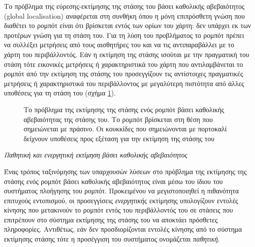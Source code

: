 Το πρόβλημα της εύρεσης-εκτίμησης της στάσης του βάσει καθολικής αβεβαιότητος
(global localisation) αναφέρεται στη συνθήκη όπου η μόνη επιπρόσθετη γνώση που
διαθέτει το ρομπότ είναι ότι βρίσκεται εντός των ορίων του χάρτη: δεν υπάρχει
εκ των προτέρων γνώση για τη στάση του. Για τη λύση του προβλήματος το ρομπότ
πρέπει να συλλέξει μετρήσεις από τους αισθητήρες του και να τις αντιπαραβάλλει
με το χάρτη του περιβάλλοντός. Εάν η εκτίμηση της στάσης ισούται με την
πραγματική του στάση τότε εικονικές μετρήσεις ή χαρακτηριστικά του χάρτη που
αντιλαμβάνεται το ρομπότ από την εκτίμηση της στάσης του προσεγγίζουν τις
αντίστοιχες πραγματικές μετρήσεις ή χαρακτηριστικά του περιβάλλοντος με
μεγαλύτερη πιστότητα από άλλες υποθέσεις για τη στάση του (σχήμα
\ref{fig:global_localisation}).

\begin{figure}[htbp]\centering
  
  \caption{\small Το πρόβλημα της εκτίμησης της στάσης ενός ρομπότ βάσει καθολικής
           αβεβαιότητας της στάσης του. Το ρομπότ βρίσκεται στη θέση που
           σημειώνεται με πράσινο. Οι κουκκίδες που σημειώνονται με πορτοκαλί
           δείχνουν υποθέσεις προς εξέταση για την εκτίμηση της στάσης του}
  \label{fig:global_localisation}
\end{figure}


\begin{bw_box}
\begin{definition}
  \label{definition:01_01_02_02:01}
  \textit{Παθητική και ενεργητική εκτίμηση βάσει καθολικής αβεβαιότητος}

  Ένας τρόπος ταξινόμησης των υπαρχουσών λύσεων στο πρόβλημα
  της εκτίμησης της στάσης ενός ρομπότ βάσει καθολικής αβεβαιότητος είναι μέσω
  του ίδιου του συστήματος πλοήγησης του ρομπότ. Προκειμένου να μεγιστοποιηθεί
  η πιθανότητα επιτυχούς εντοπισμού, οι προσεγγίσεις \textit{ενεργητικής}
  εκτίμησης υπολογίζουν εντολές κίνησης που μετακινούν το ρομπότ εντός του
  περιβάλλοντός του σε στάσεις που επιτρέπουν στο σύστημα εκτίμησης της στάσης
  του να αποκτάει πρόσθετες πληροφορίες. Αντιθέτως, εάν δεν προσδιορίζονται
  εντολές κίνησης από το σύστημα εκτίμησης στάσης τότε η προσέγγιση του
  συστήματος ονομάζεται \textit{παθητική}.
\end{definition}
\end{bw_box}

